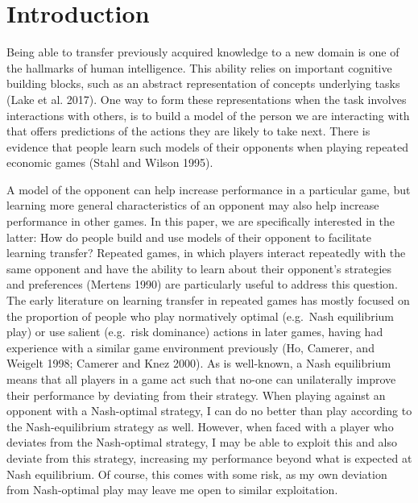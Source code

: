 \documentclass[smallextended]{svjour3}       %
\begin{document}
\def\spacingset#1{\renewcommand{\baselinestretch}%
{#1}\small\normalsize} \spacingset{1}


\hypertarget{introduction}{%
\section{Introduction}\label{introduction}}

Being able to transfer previously acquired knowledge to a new domain is
one of the hallmarks of human intelligence. This ability relies on
important cognitive building blocks, such as an abstract representation
of concepts underlying tasks (Lake et al. 2017). One way to form these
representations when the task involves interactions with others, is to
build a model of the person we are interacting with that offers
predictions of the actions they are likely to take next. There is
evidence that people learn such models of their opponents when playing
repeated economic games (Stahl and Wilson 1995).

A model of the opponent can help increase performance in a particular
game, but learning more general characteristics of an opponent may also
help increase performance in other games. In this paper, we are
specifically interested in the latter: How do people build and use
models of their opponent to facilitate learning transfer? Repeated
games, in which players interact repeatedly with the same opponent and
have the ability to learn about their opponent's strategies and
preferences (Mertens 1990) are particularly useful to address this
question. The early literature on learning transfer in repeated games
has mostly focused on the proportion of people who play normatively
optimal (e.g.~Nash equilibrium play) or use salient (e.g.~risk
dominance) actions in later games, having had experience with a similar
game environment previously (Ho, Camerer, and Weigelt 1998; Camerer and
Knez 2000). As is well-known, a Nash equilibrium means that all players
in a game act such that no-one can unilaterally improve their
performance by deviating from their strategy. When playing against an
opponent with a Nash-optimal strategy, I can do no better than play
according to the Nash-equilibrium strategy as well. However, when faced
with a player who deviates from the Nash-optimal strategy, I may be able
to exploit this and also deviate from this strategy, increasing my
performance beyond what is expected at Nash equilibrium. Of course, this
comes with some risk, as my own deviation from Nash-optimal play may
leave me open to similar exploitation.
\end{document}
